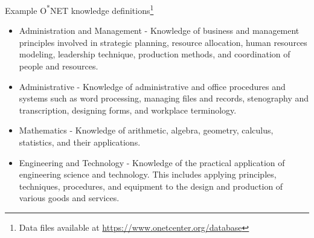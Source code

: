\documentclass{beamer}
\begin{document}
\begin{frame}{Example O\textsuperscript{*}NET knowledge definitions\footnote{Data files available at \href{https://www.onetcenter.org/database.html\#individual-files}{https://www.onetcenter.org/database}}}
  \small
  \begin{itemize}
    \item Administration and Management - Knowledge of business and management principles involved in strategic planning, resource allocation, human resources modeling, leadership technique, production methods, and coordination of people and resources.
    \item Administrative - Knowledge of administrative and office procedures and systems such as word processing, managing files and records, stenography and transcription, designing forms, and workplace terminology.
    \item Mathematics - Knowledge of arithmetic, algebra, geometry, calculus, statistics, and their applications.
    \item Engineering and Technology - Knowledge of the practical application of engineering science and technology. This includes applying principles, techniques, procedures, and equipment to the design and production of various goods and services.
  \end{itemize}  
\end{frame}

\end{document}
